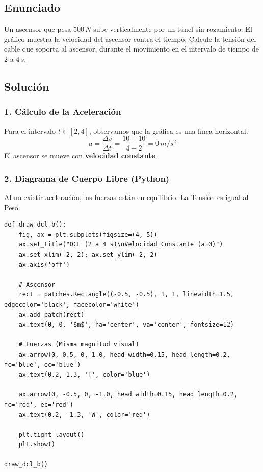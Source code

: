 \documentclass[12pt, a4paper]{article}
\begin{document}
\newpage

\subsection*{Enunciado}
Un ascensor que pesa $500 \, \si{N}$ sube verticalmente por un túnel sin rozamiento. El gráfico muestra la velocidad del ascensor contra el tiempo. Calcule la tensión del cable que soporta al ascensor, durante el movimiento en el intervalo de tiempo de $2$ a $4 \, \si{s}$.

\begin{center}
\end{center}

\subsection*{Solución}

\subsubsection*{1. Cálculo de la Aceleración}
Para el intervalo $t \in [2, 4]$, observamos que la gráfica es una línea horizontal.
$$ a = \frac{\Delta v}{\Delta t} = \frac{10 - 10}{4 - 2} = 0 \, \si{m/s^2} $$
El ascensor se mueve con \textbf{velocidad constante}.

\subsubsection*{2. Diagrama de Cuerpo Libre (Python)}
Al no existir aceleración, las fuerzas están en equilibrio. La Tensión es igual al Peso.

\begin{lstlisting}
def draw_dcl_b():
    fig, ax = plt.subplots(figsize=(4, 5))
    ax.set_title("DCL (2 a 4 s)\nVelocidad Constante (a=0)")
    ax.set_xlim(-2, 2); ax.set_ylim(-2, 2)
    ax.axis('off')
    
    # Ascensor
    rect = patches.Rectangle((-0.5, -0.5), 1, 1, linewidth=1.5, edgecolor='black', facecolor='white')
    ax.add_patch(rect)
    ax.text(0, 0, '$m$', ha='center', va='center', fontsize=12)
    
    # Fuerzas (Misma magnitud visual)
    ax.arrow(0, 0.5, 0, 1.0, head_width=0.15, head_length=0.2, fc='blue', ec='blue')
    ax.text(0.2, 1.3, 'T', color='blue')
    
    ax.arrow(0, -0.5, 0, -1.0, head_width=0.15, head_length=0.2, fc='red', ec='red')
    ax.text(0.2, -1.3, 'W', color='red')

    plt.tight_layout()
    plt.show()

draw_dcl_b()
\end{lstlisting}
\end{document}

